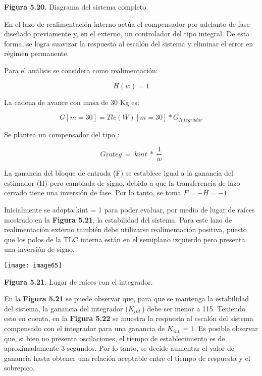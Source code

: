 \documentclass{article} %
\begin{document}
\noindent \textbf{Figura 5.20. }Diagrama del sistema completo.

\noindent 

\noindent En el lazo de realimentaci\'{o}n interno act\'{u}a el compensador por adelanto de fase dise\~{n}ado previamente y, en el externo, un controlador del tipo integral. De esta forma, se logra suavizar la respuesta al escal\'{o}n del sistema y eliminar el error en r\'{e}gimen permanente.

\noindent 

\noindent Para el an\'{a}lisis se considera como realimentaci\'{o}n: 

\noindent 
\[H(w)=1\] 

  

\noindent La cadena de avance con masa de 30 Kg es:

\noindent 
\[G[m=30]=Tlc(W)[m=30]*G_{Integrador}\] 


\noindent Se  plantea un compensador del tipo :

\noindent 
\[Ginteg\ =\ kint\ *\ \frac{1}{w}\] 


\noindent La ganancia del bloque de entrada (F) se establece igual a la ganancia del estimador (H) pero cambiada de signo, debido a que la transferencia de lazo cerrado tiene una inversi\'{o}n de fase. Por lo tanto, se toma $F=-H=-1$.

\noindent 

\noindent Inicialmente se adopta kint = 1 para poder evaluar, por medio de lugar de ra\'{i}ces mostrado en la \textbf{Figura 5.21}, la estabilidad del sistema. Para este lazo de realimentaci\'{o}n externo tambi\'{e}n debe utilizarse realimentaci\'{o}n positiva, puesto que los polos de la TLC interna est\'{a}n en el semiplano izquierdo pero presenta una inversi\'{o}n de signo.

\noindent 

\noindent \texttt{[image: image65]}

\noindent \textbf{Figura 5.21. }Lugar de ra\'{i}ces con el integrador.

\noindent 

\noindent En la \textbf{Figura 5.21 } se puede observar que, para que se mantenga la estabilidad del sistema, la ganancia del integrador ($K_{int\ }$) debe ser menor a 115. Teniendo esto en cuenta, en la \textbf{Figura 5.22} se muestra la respuesta al escal\'{o}n del sistema compensado con el integrador para una ganancia de $K_{int\ }=1$.  Es posible observar que, si bien no presenta oscilaciones, el tiempo de establecimiento es de aproximadamente 3 segundos. Por lo tanto, se decide aumentar el valor de ganancia hasta obtener una relaci\'{o}n aceptable entre el tiempo de respuesta y el sobrepico.
\end{document}
